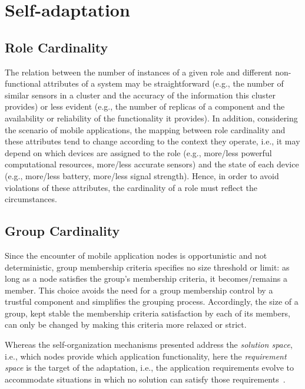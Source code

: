 \section{Self-adaptation}\label{sec:self_adaptation}

\subsection{Role Cardinality} 

The relation between the number of instances of a given role and different non-functional attributes of a system may be straightforward (e.g., the number of similar sensors in a cluster and the accuracy of the information this cluster provides) or less evident (e.g., the number of replicas of a component and the availability or reliability of the functionality it provides). In addition, considering the scenario of mobile applications, the mapping between role cardinality and these attributes tend to change according to the context they operate, i.e., it may depend on which devices are assigned to the role (e.g., more/less powerful computational resources, more/less accurate sensors) and the state of each device (e.g., more/less battery, more/less signal strength). Hence, in order to avoid violations of these attributes, the cardinality of a role must reflect the circumstances. %

\subsection{Group Cardinality} 

Since the encounter of mobile application nodes is opportunistic and not deterministic, group membership criteria specifies no size threshold or limit: as long as a node satisfies the group's membership criteria, it becomes/remains a member. This choice avoids the need for a group membership control by a trustful component and simplifies the grouping process. Accordingly, the size of a group, kept stable the membership criteria satisfaction by each of its members, can only be changed by making this criteria more relaxed or strict. 

Whereas the self-organization mechanisms presented address the \textit{solution space}, i.e., which nodes provide which application functionality, here the \textit{requirement space} is the target of the adaptation, i.e., the application requirements evolve to accommodate situations in which no solution can satisfy those requirements~\cite{RELAX}. 
